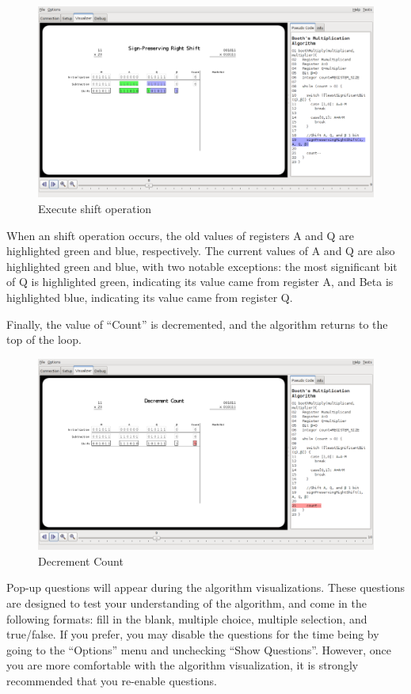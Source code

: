 \documentclass{article}
\begin{document}
\pagebreak
\begin{figure}[h]
\centering
\includegraphics[scale=0.3]{shift.pdf}
\caption{Execute shift operation}
\end{figure}

When an shift operation occurs, the old values of registers A and Q are highlighted green and blue, respectively.
The current values of A and Q are also highlighted green and blue, with two notable exceptions: the most significant bit of Q is highlighted green, indicating its value came from register A, and Beta is highlighted blue, indicating its value came from register Q.

\pagebreak
Finally, the value of ``Count'' is decremented, and the algorithm returns to the top of the loop.

\begin{figure}[h]
\centering
\includegraphics[scale=0.3]{dec.pdf}
\caption{Decrement Count}
\end{figure}

Pop-up questions will appear during the algorithm visualizations.
These questions are designed to test your understanding of the algorithm, and come in the following formats: fill in the blank, multiple choice, multiple selection, and true/false.
If you prefer, you may disable the questions for the time being by going to the ``Options'' menu and unchecking ``Show Questions''.
However, once you are more comfortable with the algorithm visualization, it is strongly recommended that you re-enable questions.
\end{document}
